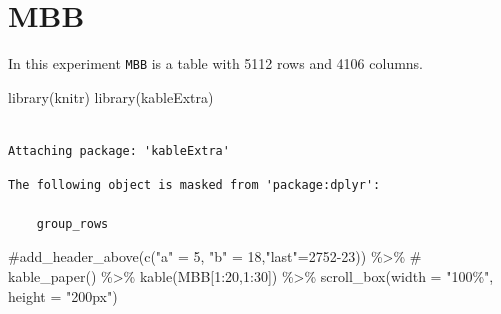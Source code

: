 \documentclass[
  letterpaper,
  DIV=11,
  numbers=noendperiod]{scrreprt}
\newenvironment{Shaded}{\begin{snugshade}}{\end{snugshade}}
\newcommand{\AttributeTok}[1]{\textcolor[rgb]{0.40,0.45,0.13}{#1}}
\newcommand{\CommentTok}[1]{\textcolor[rgb]{0.37,0.37,0.37}{#1}}
\newcommand{\DecValTok}[1]{\textcolor[rgb]{0.68,0.00,0.00}{#1}}
\newcommand{\FunctionTok}[1]{\textcolor[rgb]{0.28,0.35,0.67}{#1}}
\newcommand{\NormalTok}[1]{\textcolor[rgb]{0.00,0.23,0.31}{#1}}
\newcommand{\SpecialCharTok}[1]{\textcolor[rgb]{0.37,0.37,0.37}{#1}}
\newcommand{\StringTok}[1]{\textcolor[rgb]{0.13,0.47,0.30}{#1}}
\begin{document}
\hypertarget{mbb}{%
\section{MBB}\label{mbb}}

In this experiment \texttt{MBB} is a table with 5112 rows and 4106
columns.

\begin{Shaded}
\begin{Highlighting}[]
\FunctionTok{library}\NormalTok{(knitr)}
\FunctionTok{library}\NormalTok{(kableExtra)}
\end{Highlighting}
\end{Shaded}

\begin{verbatim}

Attaching package: 'kableExtra'
\end{verbatim}

\begin{verbatim}
The following object is masked from 'package:dplyr':

    group_rows
\end{verbatim}

\begin{Shaded}
\begin{Highlighting}[]
\CommentTok{\#add\_header\_above(c("a" = 5, "b" = 18,"last"=2752{-}23)) \%\textgreater{}\%}
\CommentTok{\# kable\_paper() \%\textgreater{}\%}
\FunctionTok{kable}\NormalTok{(MBB[}\DecValTok{1}\SpecialCharTok{:}\DecValTok{20}\NormalTok{,}\DecValTok{1}\SpecialCharTok{:}\DecValTok{30}\NormalTok{]) }\SpecialCharTok{\%\textgreater{}\%}   \FunctionTok{scroll\_box}\NormalTok{(}\AttributeTok{width =} \StringTok{"100\%"}\NormalTok{, }\AttributeTok{height =} \StringTok{"200px"}\NormalTok{)}
\end{Highlighting}
\end{Shaded}
\end{document}
